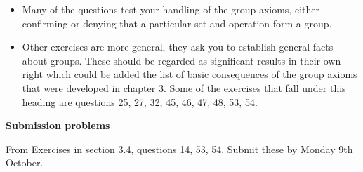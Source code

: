 \documentclass[oneside,10pt]{amsart}
\newcommand{\cbox}[1]{\begin{tcolorbox}[left=0.5mm,right=0.5mm,top=0.5mm,bottom=0.5mm, boxsep=2pt, boxrule=0pt,colback=black]\color{white}\sffamily #1 \end{tcolorbox}}
\newcommand{\topic}[1]{\cbox{\textbf{#1}}\vskip 4pt}
\begin{document}
\begin{itemize}
\item
Many of the questions test your handling of the group axioms, either confirming or denying that a particular set and operation form a group.
\item
Other exercises are more general, they ask you to establish general facts about groups. These should be regarded as significant results in their own right which could be added the list of basic consequences of the group axioms that were developed in chapter 3. Some of the exercises that fall under this heading are questions 25, 27, 32, 45, 46, 47, 48, 53, 54.
\end{itemize}

\topic{Submission problems}
From Exercises in section 3.4, questions 14, 53, 54. Submit these by Monday 9th October.
\end{document}
